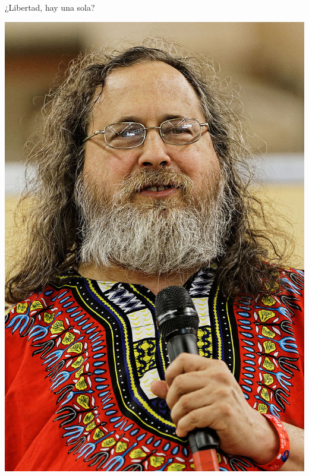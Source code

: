 \documentclass{beamer}
\begin{document}
\begin{frame}{¿Libertad, hay una sola?}
  \begin{minipage}{0.45\textwidth}
        \centering
        \includegraphics[width=\linewidth]{images/rms.jpg}
    \end{minipage}
    \hfill
    \begin{minipage}{0.45\textwidth}
        \centering

\end{minipage}
\end{frame}
\end{document}

